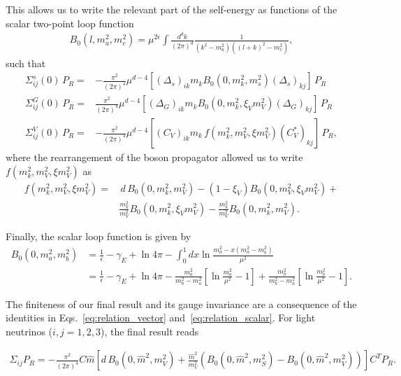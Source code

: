 This allows us to write the relevant part of the self-energy as functions of the scalar two-point loop function
\begin{align}
 B_0 (l, m_a^2,m_c^2) = \mu^{2\epsilon} \int \frac{d^d k}{(2 \pi)^d} \frac{1}{(k^2-m_a^2)( (l+k)^2 - m_c^2 )},
\end{align}
such that
\begin{align}
  \Sigma^s_{ij} (0) \, P_R =& -\frac{\pi^2}{(2\pi)^4} \mu^{d-4} \left[ (\Delta_s)_{ik} m_k B_0 (0,m_k^2, m_s^2) (\Delta_s)_{kj}\right] \, P_R \\
%
 \Sigma^G_{ij} (0) \, P_R =& \frac{\pi^2}{(2\pi)^4} \mu^{d-4} \left[ (\Delta_G)_{ik} m_k B_0 (0,m_k^2, \xi_V m_V^2) (\Delta_G)_{kj}\right] \, P_R \\
%
 \Sigma^V_{ij} (0) \, P_R =& -\frac{\pi^2}{(2 \pi)^4} \mu^{d-4} \left[ (C_V)_{ik} m_k \,f( m_k^2, m_V^2, \xi m_V^2) (C_V^*)_{kj} \right] \, P_R,
\end{align}
where the rearrangement of the boson propagator allowed us to write $f( m_k^2, m_V^2, \xi m_V^2)$ as
\begin{align*}
f( m_k^2, m_V^2, \xi m_V^2) =&\, d\, B_0(0,m_k^2, m_V^2) - (1-\xi_V) B_0 (0,m_V^2, \xi_V m_V^2) +\\ & \frac{m_k^2}{m_V^2} B_0 (0, m_k^2, \xi_V m_V^2) - \frac{m_k^2}{m_V^2} B_0 (0,  m_k^2, m_V^2). 
\end{align*}

Finally, the scalar loop function is given by
\begin{align*}
 B_0 (0,m_a^2,m_b^2) &= \frac{1}{\epsilon} - \gamma_E + \ln{4 \pi} - \int_0^1 dx \ln{\frac{m_a^2-x(m_a^2 - m_b^2)}{\mu^2}}\\
 &= \frac{1}{\epsilon} - \gamma_E + \ln{4 \pi} - \frac{m_a^2}{m_b^2 - m_a^2} \left[ \ln{\frac{m_a^2}{\mu^2}}  - 1 \right] + \frac{m_b^2}{m_b^2 - m_a^2} \left[ \ln{\frac{m_b^2}{\mu^2}}  - 1 \right].
\end{align*}

The finiteness of our final result and its gauge invariance are a consequence of the identities in Eqs.~\ref{eq:relation_vector} and~\ref{eq:relation_scalar}. For light neutrinos ($i,j=1,2,3$), the final result reads

\begin{align}
 \Sigma_{ij} P_R  = -\frac{\pi^2}{(2\pi)^4} C \hat{m}\left[ d\, B_0(0,\hat{m}^2,m_V^2) + \frac{\hat{m}^2}{m_V^2} \left( B_0 (0,\hat{m}^2,m_S^2) - B_0(0,\hat{m}^2,m_V^2) \right) \right] C^T P_R.
\end{align}

